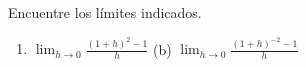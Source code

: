 \item Encuentre los límites indicados.
\begin{enumerate}
    \item[(a)] $\displaystyle \lim_{h \to 0} \frac{(1+h)^2 - 1}{h}$ \quad (b) $\displaystyle \lim_{h \to 0} \frac{(1+h)^{-2} - 1}{h}$
\end{enumerate}
